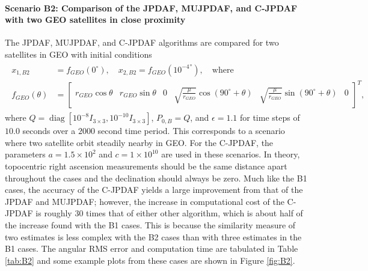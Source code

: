 \documentclass[letterpaper, paper,10pt]{AAS}		%
\newcommand{\diag}{\mathop{\mathrm{diag}}\nolimits}
\begin{document}
\paragraph*{Scenario B2: Comparison of the JPDAF, MUJPDAF, and C-JPDAF with two GEO satellites in close proximity}
The JPDAF, MUJPDAF, and C-JPDAF algorithms are compared for two satellites in GEO with initial conditions
\begin{align}
\begin{split}
x_{1,B2}&=f_{GEO}(0^\circ), \quad x_{2,B2}=f_{GEO}({10^{-4}}^\circ), \quad \mbox{where}
\\
f_{GEO}(\theta)&=\begin{bmatrix}r_{GEO}\cos\theta & r_{GEO}\sin\theta & 0 & \sqrt{\frac{\mu}{r_{GEO}}}\cos(90^\circ+\theta) & \sqrt{\frac{\mu}{r_{GEO}}}\sin(90^\circ+\theta) & 0\end{bmatrix}^T,
\end{split}
\end{align}
where $Q=\diag[10^{-8}I_{3\times3}, 10^{-10}I_{3\times3}]$, $P_{0,B}=Q$, and $\epsilon=1.1$ for time steps of $10.0$ seconds over a $2000$ second time period.
This corresponds to a scenario where two satellite orbit steadily nearby in GEO.
For the C-JPDAF, the parameters $a=1.5\times10^{2}$ and $c=1\times10^{10}$ are used in these scenarios.
In theory, topocentric right ascension measurements should be the same distance apart throughout the cases and the declination should always be zero.
Much like the B1 cases, the accuracy of the C-JPDAF yields a large improvement from that of the JPDAF and MUJPDAF; however, the increase in computational cost of the C-JPDAF is roughly $30$ times that of either other algorithm, which is about half of the increase found with the B1 cases.
This is because the similarity measure of two estimates is less complex with the B2 cases than with three estimates in the B1 cases.
The angular RMS error and computation time are tabulated in Table \ref{tab:B2} and some example plots from these cases are shown in Figure \ref{fig:B2}.
\end{document}
